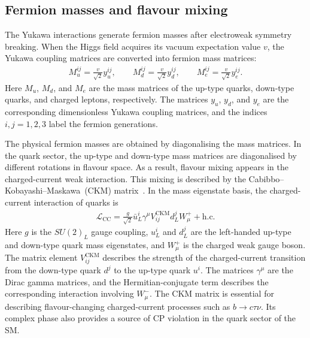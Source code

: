 \subsection{Fermion masses and flavour mixing}
\label{subsec:yukawa_flavour}

The Yukawa interactions generate fermion masses after electroweak symmetry breaking. 
When the Higgs field acquires its vacuum expectation value $v$, the Yukawa coupling matrices are converted into fermion mass matrices:
\begin{align}
    M_{u}^{ij}
    =
    \frac{v}{\sqrt{2}}y_{u}^{ij},
    \qquad
    M_{d}^{ij}
    =
    \frac{v}{\sqrt{2}}y_{d}^{ij},
    \qquad
    M_{e}^{ij}
    =
    \frac{v}{\sqrt{2}}y_{e}^{ij}.
    \label{eq:fermion_mass_matrices}
\end{align}
Here $M_{u}$, $M_{d}$, and $M_{e}$ are the mass matrices of the up-type quarks, down-type quarks, and charged leptons, respectively. 
The matrices $y_{u}$, $y_{d}$, and $y_{e}$ are the corresponding dimensionless Yukawa coupling matrices, and the indices $i,j=1,2,3$ label the fermion generations. 

The physical fermion masses are obtained by diagonalising the mass matrices. 
In the quark sector, the up-type and down-type mass matrices are diagonalised by different rotations in flavour space. 
As a result, flavour mixing appears in the charged-current weak interaction. 
This mixing is described by the Cabibbo--Kobayashi--Maskawa~(CKM) matrix~\cite{Cabibbo1963,KobayashiMaskawa1973}. 
In the mass eigenstate basis, the charged-current interaction of quarks is
\begin{align}
    \mathcal{L}_{\mathrm{CC}}
    =
    \frac{g}{\sqrt{2}}
    \bar{u}_{L}^{i}
    \gamma^{\mu}
    V_{ij}^{\mathrm{CKM}}
    d_{L}^{j}
    W_{\mu}^{+}
    +
    \mathrm{h.c.}
    \label{eq:charged_current_ckm}
\end{align}
Here $g$ is the $SU(2)_{L}$ gauge coupling, $u_{L}^{i}$ and $d_{L}^{j}$ are the left-handed up-type and down-type quark mass eigenstates, and $W_{\mu}^{+}$ is the charged weak gauge boson. 
The matrix element $V_{ij}^{\mathrm{CKM}}$ describes the strength of the charged-current transition from the down-type quark $d^{j}$ to the up-type quark $u^{i}$. 
The matrices $\gamma^{\mu}$ are the Dirac gamma matrices, and the Hermitian-conjugate term describes the corresponding interaction involving $W_{\mu}^{-}$. 
The CKM matrix is essential for describing flavour-changing charged-current processes such as $b\rightarrow c\tau\nu$. 
Its complex phase also provides a source of CP violation in the quark sector of the SM.

